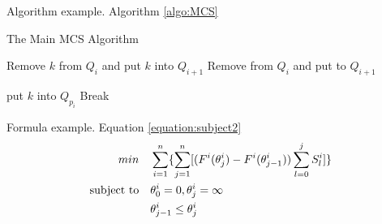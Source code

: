 Algorithm example. Algorithm \ref{algo:MCS}

\begin{algorithm}
\caption{The Main MCS Algorithm}
\begin{algorithmic}[h]

                    \State Remove $k$ from $Q_i$ and put $k$ into $Q_{i+1}$
                \EndIf
                    \State Remove from $Q_i$ and put to $Q_{i+1}$
                \EndIf
            \EndFor
        \EndFor
    \EndFunction

                \State put $k$ into $Q_{p_i}$
                \State Break
            \EndIf
         \EndFor
    \EndFunction
\end{algorithmic}
\label{algo:MCS}
\end{algorithm}
Formula example. Equation \ref{equation:subject2}
\begin{align}
\centering
min \quad & \sum_{i=1}^{n}\{\sum_{j=1}^{n}[(F^i(\theta_j^i)-F^i(\theta_{j-1}^{i}))\sum_{l=0}^{j} S_l^i]\}\\
\text{subject to}  \quad & \theta_0^i=0,\theta_j^i=\infty \\
\quad & \theta_{j-1}^i \leq \theta_j^i\label{equation:subject2}
\end{align}